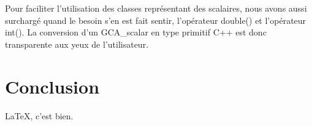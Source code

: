 \documentclass[12pt]{article}
\begin{document}
Pour faciliter l'utilisation des classes représentant des scalaires, nous avons aussi surchargé quand le besoin s'en est fait sentir, l'opérateur double() et l'opérateur int(). La conversion d'un GCA\_scalar en type primitif C++ est donc transparente aux yeux de l'utilisateur. 



\newpage
\section{Conclusion}
\LaTeX, c'est bien.

\end{document}
